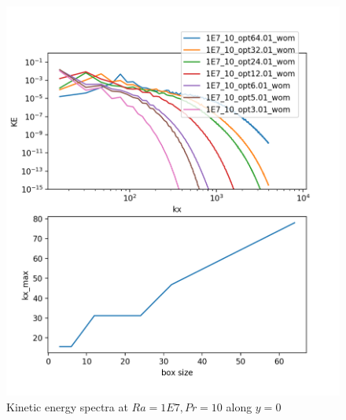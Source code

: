 \documentclass[12pt]{article}
\begin{document}
     
     \begin{figure}[!htb]
     	\includegraphics[width=\linewidth]{KE_1E7_10.png}
     	\caption{ Kinetic energy spectra at $Ra = 1E7, Pr =10$ along $y = 0$}
     	\label{fig:fig26}
     \end{figure}
     
\end{document}
